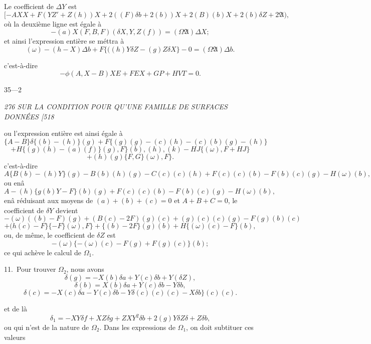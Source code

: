 \documentclass[11pt,a4paper]{book}
\begin{document}
Le coefficient de $\Delta Y$ est
\[
[-AXX + F(YZ' + Z(h))X + 2((F)\delta b + 2(b))X + 2(B)(b)X + 2(b)\delta Z + 2 \mathfrak{A} ),
\]
o\`u la deuxi\`eme ligne est \'egale \`a
\[
- (a)X(F, B, F)(\delta X, Y, Z(f)) = (\Omega \mathfrak{A})\Delta X;
\]
et ainsi l'expression enti\`ere se m\'ettra \`a
\[
(\omega) - (h - X)\Delta b + F\{((h)Y\delta Z - (g)Z\delta X\} - 0 = (\Omega \mathfrak{A})\Delta b.
\]

c'est-\`a-dire
\[
- \phi(A, X - B)X E + F E X + GP + H V T = 0.
\]

\medskip
\hfill 35---2

\clearpage

\noindent\textit{276 \hfill SUR LA CONDITION POUR QU'UNE FAMILLE DE SURFACES DONN\'EES \hfill [518}

\medskip

ou l'expression enti\`ere est ainsi \'egale \`a
\[
\{A - B\}\delta\{(b) - (h)\} (g) + F\{(g)(g) - (c)(h) - (c)(b) (g) - (h)\}
\]
\[
+ H\{(g)(h) - (a)(f)\}(g), F\}(b), (h), (k) - HJ \{(\omega), F + HJ \}
\]
\[
+ (h)(g) \{F, G\}(\omega), F\}.
\]
c'est-\`a-dire
\[
A\{B(b) - (h)Y\}(g) - B(b)(h)(g) - C(c)(c)(h) + F(c)(c)(b) - F(b)(c)(g) - H(\omega)(b),
\]
ou en\^a
\[
A - (h)\{g(b)Y - F\}(b)(g) + F(c)(c)(b) - F(b)(c)(g) - H(\omega)(b),
\]
en\^a r\'eduisant aux moyens de $(a) + (b) + (c) = 0$ et $A + B + C = 0$, le coefficient de $\delta Y$
devient
\[
- (\omega)((b) - F)(g) + (B(c) - 2F)(g)(c) + (g)(c)(c)(g) - F(g)(b)(c)
\]
\[
+ (h(c) - F\}\{- F\}(\omega), F\} + \{(b) - 2F\}(g)(b) + H\{(\omega)(c) - F\}(b),
\]
ou, de m\^eme, le coefficient de $\delta Z$ est
\[
- (\omega)\{- (\omega)(c) - F(g) + F(g)(c)\}(b);
\]
ce qui ach\`eve le calcul de $\Omega_1$.

\medskip

\quad [Pp.~246---250.]

\medskip

11.~Pour trouver $\Omega_2$, nous avons
\[
\delta(g) = - X(b)\delta a + Y(c)\delta b + Y(\delta Z),
\]
\[
\delta(b) = X(b)\delta a + Y(c)\delta b - Y\delta b,
\]
\[
\delta(c) = - X(c)\delta a - Y(c)\delta b - Y\delta(c)(c)(c) - X\delta b\}(c)(c).
\]

\medskip

et de l\`a
\[
\delta_1 = - X Y\delta f + X Z\delta g + ZXY^2 \delta b + 2(g)Y\delta Z\delta + Z\delta b ,
\]
ou qui n'est de la nature de $\Omega_2$. Dans les expressions de $\Omega_1$, on doit subtituer ces valeurs

\medskip

\quad \quad [Pp.~246---250.]
\end{document}
